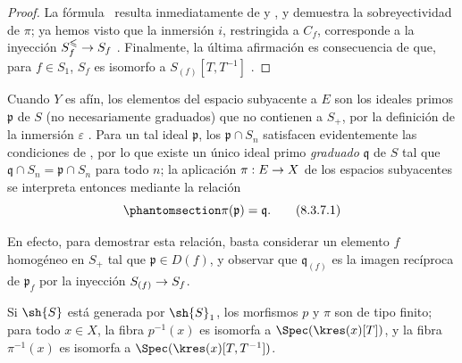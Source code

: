 \documentclass[oneside,10pt]{amsart}
\makeatletter
\renewcommand{\leq}{\leqslant}
\newcommand{\ega@arrow}[2]{\mathchoice{#1}{#2}{#2}{#2}}
\renewcommand{\to}{\ega@arrow{\longrightarrow}{\rightarrow}}
\newcommand{\oldpage}[2][]{\marginnote{\normalfont\footnotesize\textbf{#1}~|~#2}\ignorespaces}
\let\EGAOriginalLabel\label
\renewcommand{\label}[1]{\phantomsection\EGAOriginalLabel{#1}}
\makeatother
\begin{document}
\begin{proof}
La fórmula~ resulta inmediatamente de  y , y demuestra la sobreyectividad de $\pi$;
ya hemos visto que la inmersión $i$, restringida a $C_f$, corresponde
\oldpage[II]{166}
a la inyección $S_f^\leq\to S_f$ .
Finalmente, la última afirmación es consecuencia de que, para $f\in S_1$, $S_f$ es isomorfo a $S_{(f)}[T,T^{-1}]$ .
\end{proof}
\begin{remark}[8.3.7]
\label{II.8.3.7}
Cuando $Y$ es afín, los elementos del espacio subyacente a $E$ son los ideales primos $\mathfrak{p}$ de $S$ (no necesariamente graduados) que no contienen a $S_+$, por la definición de la inmersión $\varepsilon$ .
Para un tal ideal $\mathfrak{p}$, los $\mathfrak{p}\cap S_n$ satisfacen evidentemente las condiciones de , por lo que existe un único ideal primo \emph{graduado} $\mathfrak{q}$ de $S$ tal que $\mathfrak{q}\cap S_n=\mathfrak{p}\cap S_n$ para todo $n$;
la aplicación $\pi:E\to X$ de los espacios subyacentes se interpreta entonces mediante la relación
\[
\label{II.8.3.7.1}
  \pi(\mathfrak{p}) = \mathfrak{q}.
\tag{8.3.7.1}
\]

En efecto, para demostrar esta relación, basta considerar un elemento $f$ homogéneo en $S_+$ tal que $\mathfrak{p}\in D(f)$, y observar que $\mathfrak{q}_{(f)}$ es la imagen recíproca de $\mathfrak{p}_f$ por la inyección $S_{(f)}\to S_f$.
\end{remark}

\begin{corollary}[8.3.8]
\label{II.8.3.8}
Si $\sh{S}$ está generada por $\sh{S}_1$, los morfismos $p$ y $\pi$ son de tipo finito;
para todo $x\in X$, la fibra $p^{-1}(x)$ es isomorfa a $\Spec(\kres(x)[T])$, y la fibra $\pi^{-1}(x)$ es isomorfa a $\Spec(\kres(x)[T,T^{-1}])$.
\end{corollary}
\end{document}

